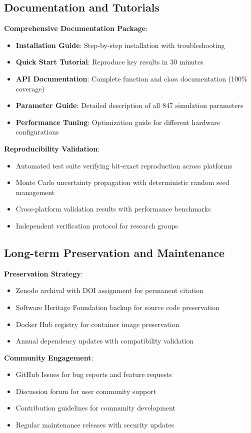 \documentclass[12pt,a4paper]{article}
\begin{document}
\subsection{Documentation and Tutorials}

\textbf{Comprehensive Documentation Package}:
\begin{itemize}
\item \textbf{Installation Guide}: Step-by-step installation with troubleshooting
\item \textbf{Quick Start Tutorial}: Reproduce key results in 30 minutes
\item \textbf{API Documentation}: Complete function and class documentation (100\% coverage)
\item \textbf{Parameter Guide}: Detailed description of all 847 simulation parameters
\item \textbf{Performance Tuning}: Optimization guide for different hardware configurations
\end{itemize}

\textbf{Reproducibility Validation}:
\begin{itemize}
\item Automated test suite verifying bit-exact reproduction across platforms
\item Monte Carlo uncertainty propagation with deterministic random seed management
\item Cross-platform validation results with performance benchmarks
\item Independent verification protocol for research groups
\end{itemize}

\subsection{Long-term Preservation and Maintenance}

\textbf{Preservation Strategy}:
\begin{itemize}
\item Zenodo archival with DOI assignment for permanent citation
\item Software Heritage Foundation backup for source code preservation
\item Docker Hub registry for container image preservation
\item Annual dependency updates with compatibility validation
\end{itemize}

\textbf{Community Engagement}:
\begin{itemize}
\item GitHub Issues for bug reports and feature requests
\item Discussion forum for user community support
\item Contribution guidelines for community development
\item Regular maintenance releases with security updates
\end{itemize}
\end{document}
